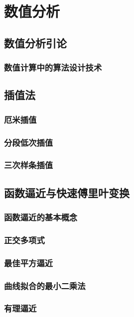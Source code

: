 \part{数值分析}
\chapter{数值分析引论}




\section{数值计算中的算法设计技术}

\chapter{插值法}



\section{厄米插值}
\section{分段低次插值}
\section{三次样条插值}

\chapter{函数逼近与快速傅里叶变换}
\section{函数逼近的基本概念}
\section{正交多项式}
\section{最佳平方逼近}
\section{曲线拟合的最小二乘法}
\section{有理逼近}
